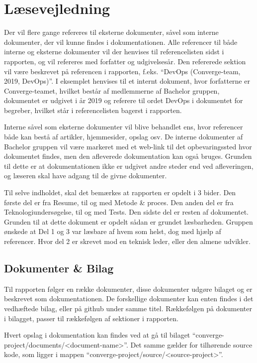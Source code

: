 \chapter{Læsevejledning}

Der vil flere gange refereres til eksterne dokumenter, såvel som interne dokumenter, der vil kunne findes i dokumentationen. Alle referencer til både interne og eksterne dokumenter vil der henvises til referencelisten sidst i rapporten, og vil refereres med forfatter og udgivelsesår. Den refererede sektion vil være beskrevet på referencen i rapporten, f.eks. “DevOps (Converge-team, 2019, DevOps)”. I eksemplet henvises til et internt dokument, hvor forfatterne er Converge-teamet, hvilket består af medlemmerne af Bachelor gruppen, dokumentet er udgivet i år 2019 og referere til ordet DevOps \cite[DevOps]{converge-terms} i dokumentet for begreber, hvilket står i referencelisten bagerst i rapporten.

Interne såvel som eksterne dokumenter vil blive behandlet ens, hvor referencer både kan bestå af artikler, hjemmesider, opslag osv. De interne dokumenter af Bachelor gruppen vil være markeret med et web-link til det opbevaringssted hvor dokumentet findes, men den afleverede dokumentation kan også bruges. Grunden til dette er at dokumentationen ikke er udgivet andre steder end ved afleveringen, og læseren skal have adgang til de givne dokumenter.

Til selve indholdet, skal det bemærkes at rapporten er opdelt i 3 bider. Den første del er fra Resume, til og med Metode \& proces. Den anden del er fra Teknologiundersøgelse, til og med Tests. Den sidste del er resten af dokumentet. Grunden til at dette dokument er opdelt sådan er grundet læsbarheden. Gruppen ønskede at Del 1 og 3 var læsbare af hvem som helst, dog med hjælp af referencer. Hvor del 2 er skrevet mod en teknisk leder, eller den almene udvikler.

\section{Dokumenter \& Bilag}

Til rapporten følger en række dokumenter, disse dokumenter udgøre bilaget og er beskrevet som dokumentationen. De forskellige dokumenter kan enten findes i det vedhæftede bilag, eller på github under samme titel. Rækkefølgen på dokumenter i bilagget, passer til rækkefølgen af sektioner i rapporten.

Hvert opslag i dokumentation kan findes ved at gå til bilaget ``converge-project/documents/<document-name>''. Det samme gælder for tilhørende source kode, som ligger i mappen ``converge-project/source/<source-project>''.

